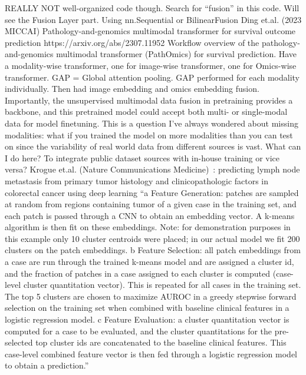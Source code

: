 \documentclass{article}%
\begin{document}
\newline%
\newline%
%
REALLY NOT well{-}organized code though. Search for “fusion” in this code. Will see the Fusion Layer part. Using nn.Sequential or BilinearFusion %
\newline%
\newline%
%
Ding et.al. (2023 MICCAI) Pathology{-}and{-}genomics multimodal transformer for survival outcome prediction %
\newline%
\newline%
%
 https://arxiv.org/abs/2307.11952 %
\newline%
\newline%
%
Workflow overview of the pathology{-}and{-}genomics multimodal transformer (PathOmics) for survival prediction. Have a modality{-}wise transformer, one for image{-}wise transformer, one for Omics{-}wise transformer. GAP = Global attention pooling. GAP performed for each modality individually. Then had image embedding and omics embedding fusion. Importantly, the unsupervised multimodal data fusion in pretraining provides a backbone, and this pretrained model could accept both multi{-} or single{-}modal data for model finetuning. This is a question I’ve always wondered about missing modalities: what if you trained the model on more modalities than you can test on since the variability of real world data from different sources is vast. What can I do here? To integrate public dataset sources with in{-}house training or vice versa? %
\newline%
\newline%
%
Krogue et.al. (Nature Communications Medicine)~: predicting lymph node metastasis from primary tumor histology and clinicopathologic factors in colorectal cancer using deep learning %
\newline%
\newline%
%
%
\newline%
\newline%
%
 “a Feature Generation: patches are sampled at random from regions containing tumor of a given case in the training set, and each patch is passed through a CNN to obtain an embedding vector. A k{-}means algorithm is then fit on these embeddings. Note: for demonstration purposes in this example only 10 cluster centroids were placed; in our actual model we fit 200 clusters on the patch embeddings. b Feature Selection: all patch embeddings from a case are run through the trained k{-}means model and are assigned a cluster id, and the fraction of patches in a case assigned to each cluster is computed (case{-}level cluster quantitation vector). This is repeated for all cases in the training set. The top 5 clusters are chosen to maximize AUROC in a greedy stepwise forward selection on the training set when combined with baseline clinical features in a logistic regression model. c Feature Evaluation: a cluster quantitation vector is computed for a case to be evaluated, and the cluster quantitations for the pre{-}selected top cluster ids are concatenated to the baseline clinical features. This case{-}level combined feature vector is then fed through a logistic regression model to obtain a prediction.”%
\end{document}
